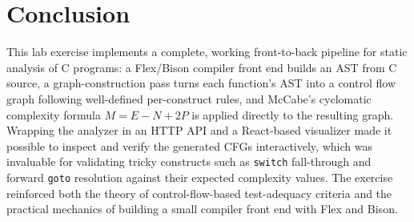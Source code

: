 \documentclass[11pt]{article}
\begin{document}
\section{Conclusion}
This lab exercise implements a complete, working front-to-back pipeline for static analysis of C programs: a Flex/Bison compiler front end builds an AST from C source, a graph-construction pass turns each function's AST into a control flow graph following well-defined per-construct rules, and McCabe's cyclomatic complexity formula $M = E - N + 2P$ is applied directly to the resulting graph. Wrapping the analyzer in an HTTP API and a React-based visualizer made it possible to inspect and verify the generated CFGs interactively, which was invaluable for validating tricky constructs such as \texttt{switch} fall-through and forward \texttt{goto} resolution against their expected complexity values. The exercise reinforced both the theory of control-flow-based test-adequacy criteria and the practical mechanics of building a small compiler front end with Flex and Bison.
\end{document}
